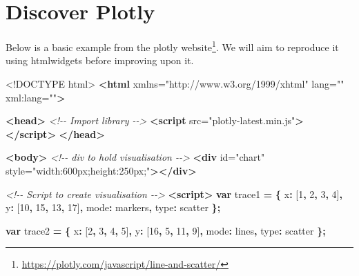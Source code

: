 \documentclass[
]{krantz}
\makeatletter
\newenvironment{Shaded}{\begin{snugshade}}{\end{snugshade}}
\newcommand{\CommentTok}[1]{\textcolor[rgb]{0.37,0.37,0.37}{\textit{#1}}}
\newcommand{\DataTypeTok}[1]{\textcolor[rgb]{0.27,0.27,0.27}{#1}}
\newcommand{\DecValTok}[1]{\textcolor[rgb]{0.06,0.06,0.06}{#1}}
\newcommand{\KeywordTok}[1]{\textcolor[rgb]{0.27,0.27,0.27}{\textbf{#1}}}
\newcommand{\NormalTok}[1]{#1}
\newcommand{\OperatorTok}[1]{\textcolor[rgb]{0.43,0.43,0.43}{\textbf{#1}}}
\newcommand{\OtherTok}[1]{\textcolor[rgb]{0.37,0.37,0.37}{#1}}
\newcommand{\StringTok}[1]{\textcolor[rgb]{0.5,0.5,0.5}{#1}}
\renewcommand{\href}[2]{#2\footnote{\url{#1}}}
\newenvironment{kframe}{%
\medskip{}
\setlength{\fboxsep}{.8em}
 \def\at@end@of@kframe{}%
 \ifinner\ifhmode%
  \def\at@end@of@kframe{\end{minipage}}%
  \begin{minipage}{\columnwidth}%
 \fi\fi%
 \def\FrameCommand##1{\hskip\@totalleftmargin \hskip-\fboxsep
 \colorbox{shadecolor}{##1}\hskip-\fboxsep
     \hskip-\linewidth \hskip-\@totalleftmargin \hskip\columnwidth}%
 \MakeFramed {\advance\hsize-\width
   \@totalleftmargin\z@ \linewidth\hsize
   \@setminipage}}%
 {\par\unskip\endMakeFramed%
 \at@end@of@kframe}
\renewenvironment{Shaded}{\begin{kframe}}{\end{kframe}}
\makeatother
\begin{document}
\hypertarget{widgets-ex-plotly-discover}{%
\section{Discover Plotly}\label{widgets-ex-plotly-discover}}

Below is a basic example from the \href{https://plotly.com/javascript/line-and-scatter/}{plotly website}. We will aim to reproduce it using htmlwidgets before improving upon it.

\begin{Shaded}
\begin{Highlighting}[]
\DataTypeTok{<!DOCTYPE }\NormalTok{html}\DataTypeTok{>}
\KeywordTok{<html}\OtherTok{ xmlns=}\StringTok{"http://www.w3.org/1999/xhtml"}\OtherTok{ lang=}\StringTok{""}\OtherTok{ xml:lang=}\StringTok{""}\KeywordTok{>}

\KeywordTok{<head>}
  \CommentTok{<!{-}{-} Import library {-}{-}>}
  \KeywordTok{<script}\OtherTok{ src=}\StringTok{"plotly{-}latest.min.js"}\KeywordTok{></script>}
\KeywordTok{</head>}

\KeywordTok{<body>}
  \CommentTok{<!{-}{-} div to hold visualisation {-}{-}>}
  \KeywordTok{<div}\OtherTok{ id=}\StringTok{"chart"}\OtherTok{ style=}\StringTok{"width:600px;height:250px;"}\KeywordTok{></div>}

  \CommentTok{<!{-}{-} Script to create visualisation {-}{-}>}
  \KeywordTok{<script>}
    \KeywordTok{var}\NormalTok{ trace1 }\OperatorTok{=} \OperatorTok{\{}
      \DataTypeTok{x}\OperatorTok{:}\NormalTok{ [}\DecValTok{1}\OperatorTok{,} \DecValTok{2}\OperatorTok{,} \DecValTok{3}\OperatorTok{,} \DecValTok{4}\NormalTok{]}\OperatorTok{,}
      \DataTypeTok{y}\OperatorTok{:}\NormalTok{ [}\DecValTok{10}\OperatorTok{,} \DecValTok{15}\OperatorTok{,} \DecValTok{13}\OperatorTok{,} \DecValTok{17}\NormalTok{]}\OperatorTok{,}
      \DataTypeTok{mode}\OperatorTok{:} \StringTok{\textquotesingle{}markers\textquotesingle{}}\OperatorTok{,}
      \DataTypeTok{type}\OperatorTok{:} \StringTok{\textquotesingle{}scatter\textquotesingle{}}
    \OperatorTok{\};}

    \KeywordTok{var}\NormalTok{ trace2 }\OperatorTok{=} \OperatorTok{\{}
      \DataTypeTok{x}\OperatorTok{:}\NormalTok{ [}\DecValTok{2}\OperatorTok{,} \DecValTok{3}\OperatorTok{,} \DecValTok{4}\OperatorTok{,} \DecValTok{5}\NormalTok{]}\OperatorTok{,}
      \DataTypeTok{y}\OperatorTok{:}\NormalTok{ [}\DecValTok{16}\OperatorTok{,} \DecValTok{5}\OperatorTok{,} \DecValTok{11}\OperatorTok{,} \DecValTok{9}\NormalTok{]}\OperatorTok{,}
      \DataTypeTok{mode}\OperatorTok{:} \StringTok{\textquotesingle{}lines\textquotesingle{}}\OperatorTok{,}
      \DataTypeTok{type}\OperatorTok{:} \StringTok{\textquotesingle{}scatter\textquotesingle{}}
    \OperatorTok{\};}


\end{Highlighting}
\end{Shaded}
\end{document}
